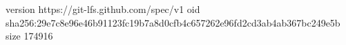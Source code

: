 version https://git-lfs.github.com/spec/v1
oid sha256:29e7c8e96e46b91123fc19b7a8d0cfb4c657262e96fd2cd3ab4ab367bc249e5b
size 174916
